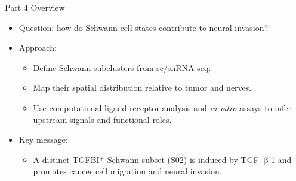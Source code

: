 \documentclass[10pt]{beamer}
\theoremstyle{plain}
\begin{document}
\begin{frame}{Part 4 Overview}
  \begin{itemize}
    \item Question: how do Schwann cell states contribute to neural invasion?
    \item Approach:
      \begin{itemize}
        \item Define Schwann subclusters from sc/snRNA-seq.
        \item Map their spatial distribution relative to tumor and nerves.
        \item Use computational ligand-receptor analysis and \textit{in vitro} assays to infer upstream signals and functional roles.
      \end{itemize}
    \item Key message:
      \begin{itemize}
        \item A distinct TGFBI\(^{+}\) Schwann subset (S02) is induced by TGF-\(\upbeta\)1 and promotes cancer cell migration and neural invasion.
      \end{itemize}
  \end{itemize}
\end{frame}
\end{document}
